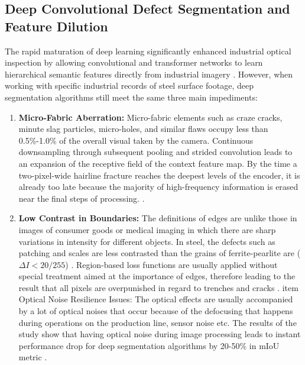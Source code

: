 \documentclass{ieeeaccess}
\begin{document}
\subsection{Deep Convolutional Defect Segmentation and Feature Dilution}
\label{sec:intro_deep_limits}
The rapid maturation of deep learning significantly enhanced industrial optical inspection by allowing convolutional and transformer networks to learn hierarchical semantic features directly from industrial imagery \cite{survey2024, ef2net2024}. However, when working with specific industrial records of steel surface footage, deep segmentation algorithms still meet the same three main impediments:
\begin{enumerate}
    \item \textbf{Micro-Fabric Aberration:} Micro-fabric elements such as craze cracks, minute slag particles, micro-holes, and similar flaws occupy less than 0.5\%-1.0\% of the overall visual taken by the camera. Continuous downsampling through subsequent pooling and strided convolution leads to an expansion of the receptive field of the context feature map. By the time a two-pixel-wide hairline fracture reaches the deepest levels of the encoder, it is already too late because the majority of high-frequency information is erased near the final steps of processing. \cite{gnapsc2024, dilated_multiscale2024}.
    \item \textbf{Low Contrast in Boundaries:} The definitions of edges are unlike those in images of consumer goods or medical imaging in which there are sharp variations in intensity for different objects. In steel, the defects such as patching and scales are less contrasted than the grains of ferrite-pearlite are ($\Delta I < 20/255$) \cite{ispad2025, fewshot_steel2026}. Region-based loss functions are usually applied without special treatment aimed at the importance of edges, therefore leading to the result that all pixels are overpunished in regard to trenches and cracks \cite{bahrnet2025, potholebaf2024}. 
    item {Optical Noise Resilience Issues:} The optical effects are usually accompanied by a lot of optical noises that occur because of the defocusing that happens during operations on the production line, sensor noise etc. The results of the study show that having optical noise during image processing leads to instant performance drop for deep segmentation algorithms by 20-50\% in mIoU metric \cite{neu_benchmark2025, mvtecad2_2026}. 


\end{enumerate}
\end{document}
